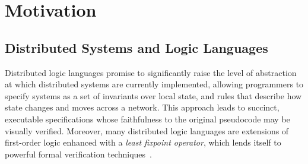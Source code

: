 \section{Motivation}


\subsection{Distributed Systems and Logic Languages}
\label{sec:dsll}


Distributed logic languages  promise to significantly raise the level of
abstraction at which distributed systems are currently implemented, allowing
programmers to specify systems as a set of invariants over local state,
and rules that describe how state changes and moves across a network. 
This approach leads to succinct, executable specifications whose faithfulness to the original pseudocode may be visually verified.
Moreover, many 
distributed logic languages are extensions of first-order logic enhanced with
a {\em least fixpoint operator}, which lends itself to powerful
formal verification techniques~\cite{wang, wang2}.

